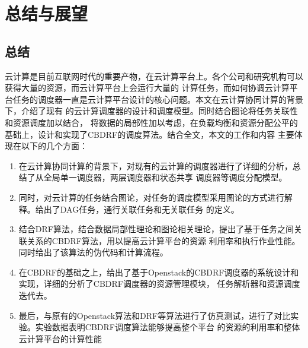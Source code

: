 

\chapter{总结与展望}
\label{cha:conclusions}
\section{总结}
云计算是目前互联网时代的重要产物，在云计算平台上。各个公司和研究机构可以获得大量的资源，而云计算平台上会运行大量的
计算任务，而如何协调云计算平台任务的调度器一直是云计算平台设计的核心问题。本文在云计算协同计算的背景下，介绍了现有
的云计算调度器的设计和调度模型。同时结合图论将任务关联性和资源调度加以结合，
将数据的局部性加以考虑，在负载均衡和资源分配公平的基础上，设计和实现了CBDRF的调度算法。结合全文，本文的工作和内容
主要体现在以下的几个方面：
\begin{enumerate}
\item 在云计算协同计算的背景下，对现有的云计算的调度器进行了详细的分析，总结了从全局单一调度器，两层调度器和状态共享
调度器等调度分配模型。
\item 同时，对云计算的任务结合图论，对任务的调度模型采用图论的方式进行解释。给出了DAG任务，通行关联任务和无关联任务
的定义。
\item 结合DRF算法，结合数据局部性理论和图论相关理论，提出了基于任务之间关联关系的CBDRF算法，用以提高云计算平台的资源
利用率和执行作业性能。同时给出了该算法的伪代码和计算流程。
\item 在CBDRF的基础之上，给出了基于Openstack的CBDRF调度器的系统设计和实现，详细的分析了CBDRF调度器的资源管理模块，
任务解析器和资源调度迭代去。
\item 最后，与原有的Openstack算法和DRF等算法进行了仿真测试，进行了对比实验。实验数据表明CBDRF调度算法能够提高整个平台
的资源的利用率和整体云计算平台的计算性能
\end{enumerate}

